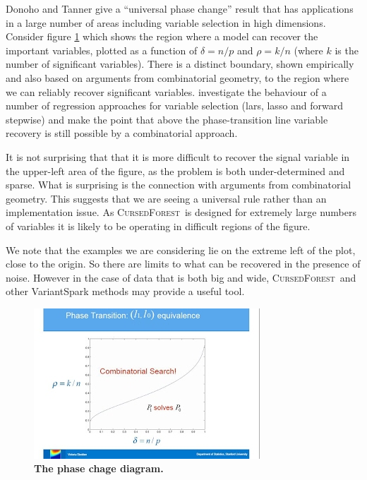 \documentclass[10pt,letterpaper]{article}
\newcommand{\cursedforest}{\textsc{CursedForest}\ }
\begin{document}
Donoho and Tanner \cite{Donoho.and.Tanner.2009} give a ``universal phase change'' result that has applications in a
large number of areas including variable selection in high dimensions. Consider figure
\ref{figure:phase-diagram-equivalence.png} which shows the region where a model can recover the important variables,
plotted as a function of $\delta = n/p$ and $\rho =k/n$ (where $k$ is the number of significant variables). There is a
distinct boundary, shown empirically and also based on arguments from combinatorial geometry, to the region where we can
reliably recover significant variables.  \cite{Donoho.and.Stodden.2006} investigate the behaviour of a number of
regression approaches for variable selection (lars, lasso and forward stepwise) and make the point that above the
phase-transition line variable recovery is still possible by a combinatorial approach.


It is not surprising that that it is more difficult to recover the signal variable in the upper-left area of the figure,
as the problem is both under-determined and sparse. What is surprising is the connection with arguments from
combinatorial geometry. This suggests that we are seeing a universal rule rather than an implementation issue. As
\cursedforest is designed for extremely large numbers of variables it is likely to be operating in difficult regions of
the figure. 

We note that the examples we are considering lie on the extreme left of the plot, close to the origin. So there are
limits to what can be recovered in the presence of noise. However in the case of data that is both big and wide,
\cursedforest and other VariantSpark methods may provide a useful tool.


\begin{figure}[tbhp] 
 \begin{adjustwidth}{-1.00in}{0in}
    \centering
    \includegraphics[totalheight=6cm]{./figs/phase-diagram-equivalence.png} 
    \caption{{\bf The phase chage diagram.}}
    \label{figure:phase-diagram-equivalence.png} 
    \vspace{4ex}
  \end{adjustwidth}
\end{figure}
\end{document}
